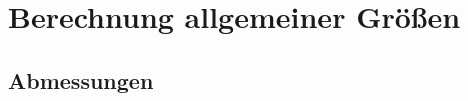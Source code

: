 \documentclass[../main.tex]{subfiles}
\begin{document}
    \section{Berechnung allgemeiner Größen}
    \subsection{Abmessungen}
        
    \newpage
\end{document}
